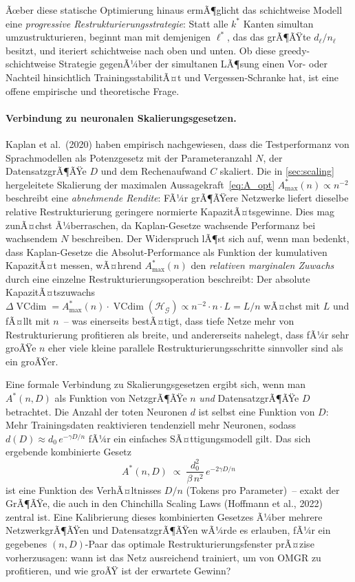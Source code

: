 ﻿\documentclass[12pt, a4paper, openany]{report}
\newcommand{\calG}{\mathcal{G}}
\newcommand{\calH}{\mathcal{H}}
\DeclareMathOperator{\VC}{VCdim}
\begin{document}
Ãœber diese statische Optimierung hinaus ermÃ¶glicht das schichtweise Modell
eine \emph{progressive Restrukturierungsstrategie}: Statt alle $k^*$ Kanten
simultan umzustrukturieren, beginnt man mit demjenigen $\ell^*$, das das
grÃ¶ÃŸte $d_{\ell} / n_{\ell}$ besitzt, und iteriert schichtweise nach oben
und unten.  Ob diese greedy-schichtweise Strategie gegenÃ¼ber der simultanen
LÃ¶sung einen Vor- oder Nachteil hinsichtlich Trainings\-stabilitÃ¤t und
Vergessen-Schranke hat, ist eine offene empirische und theoretische Frage.

\paragraph{Verbindung zu neuronalen Skalierungsgesetzen.}
Kaplan et al.\ (2020) haben empirisch nachgewiesen, dass die Testperformanz
von Sprachmodellen als Potenzgesetz mit der Parameteranzahl $N$, der
DatensatzgrÃ¶ÃŸe $D$ und dem Rechenaufwand $C$ skaliert.  Die in \cref{sec:scaling}
hergeleitete Skalierung der maximalen Aussagekraft~\eqref{eq:A_opt}
$A^*_{\max}(n) \propto n^{-2}$ beschreibt eine \emph{abnehmende Rendite}:
FÃ¼r grÃ¶ÃŸere Netzwerke liefert dieselbe relative Restrukturierung geringere
normierte KapazitÃ¤tsgewinne.  Dies mag zunÃ¤chst Ã¼berraschen, da Kaplan-Gesetze
wachsende Performanz bei wachsendem $N$ beschreiben.  Der Widerspruch lÃ¶st
sich auf, wenn man bedenkt, dass Kaplan-Gesetze die Absolut-Performance als
Funktion der kumulativen KapazitÃ¤t messen, wÃ¤hrend $A^*_{\max}(n)$ den
\emph{relativen marginalen Zuwachs} durch eine einzelne Restrukturierungsoperation
beschreibt: Der absolute KapazitÃ¤tszuwachs
$\Delta\VC = A^*_{\max}(n) \cdot \VC(\calH_{\calG}) \propto n^{-2} \cdot n \cdot L = L/n$
wÃ¤chst mit $L$ und fÃ¤llt mit $n$~-- was einerseits bestÃ¤tigt, dass tiefe
Netze mehr von Restrukturierung profitieren als breite, und andererseits
nahelegt, dass fÃ¼r sehr groÃŸe $n$ eher viele kleine parallele
Restrukturierungsschritte sinnvoller sind als ein groÃŸer.

Eine formale Verbindung zu Skalierungsgesetzen ergibt sich, wenn man
$A^*(n, D)$ als Funktion von NetzgrÃ¶ÃŸe $n$ \emph{und} DatensatzgrÃ¶ÃŸe $D$
betrachtet.  Die Anzahl der toten Neuronen $d$ ist selbst eine Funktion von
$D$: Mehr Trainingsdaten reaktivieren tendenziell mehr Neuronen, sodass
$d(D) \approx d_0\,e^{-\gamma D/n}$ fÃ¼r ein einfaches SÃ¤ttigungsmodell gilt.
Das sich ergebende kombinierte Gesetz
\[
  A^*(n, D) \;\propto\; \frac{d_0^2}{\beta\,n^2}\,e^{-2\gamma D/n}
\]
ist eine Funktion des VerhÃ¤ltnisses $D/n$ (Tokens pro Parameter)~-- exakt
der GrÃ¶ÃŸe, die auch in den Chinchilla Scaling Laws (Hoffmann et al., 2022)
zentral ist.  Eine Kalibrierung dieses kombinierten Gesetzes Ã¼ber mehrere
NetzwerkgrÃ¶ÃŸen und DatensatzgrÃ¶ÃŸen wÃ¼rde es erlauben, fÃ¼r ein gegebenes
$(n, D)$-Paar das optimale Restrukturierungsfenster prÃ¤zise vorherzusagen:
wann ist das Netz ausreichend trainiert, um von OMGR zu profitieren, und
wie groÃŸ ist der erwartete Gewinn?
\end{document}
